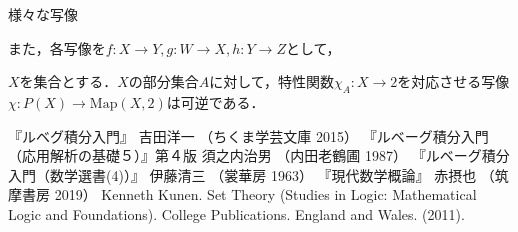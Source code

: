 \documentclass[uplatex, 12pt, a4paper, dvipdfmx]{jsreport}
\begin{document}
\begin{itembox}[l]{様々な写像}
\begin{definition}[composition]
		また，各写像を$f:X\to Y, g:W\to X, h:Y\to Z$として，
		\begin{center}\end{center}
	\end{definition}
\end{itembox}

\begin{proposition}[部分集合と特性関数]
	$X$を集合とする．$X$の部分集合$A$に対して，特性関数$\chi_A:X\to 2$を対応させる写像$\chi :P(X)\to \mathrm{Map}(X,2)$は可逆である．
\end{proposition}

\begin{thebibliography}{99}
	 『ルベグ積分入門』 吉田洋一 （ちくま学芸文庫 2015）
	 『ルベーグ積分入門（応用解析の基礎５）』第４版 須之内治男 （内田老鶴圃 1987）
	 『ルベーグ積分入門（数学選書(4)）』 伊藤清三 （裳華房 1963）
	 『現代数学概論』 赤摂也 （筑摩書房 2019）
	 Kenneth Kunen. Set Theory (Studies in Logic: Mathematical Logic and Foundations). College Publications. England and Wales. (2011).
\end{thebibliography}
\end{document}
